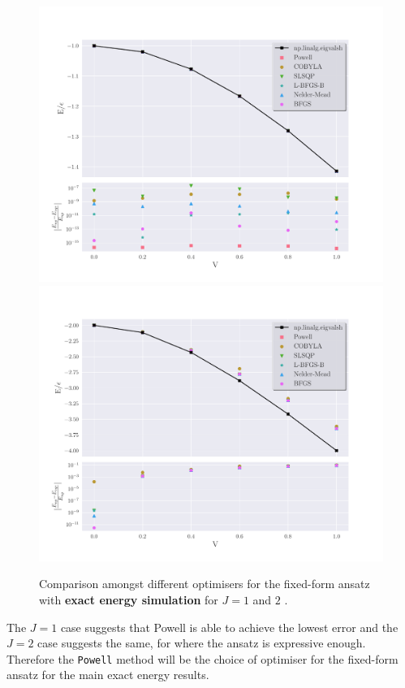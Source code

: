\begin{figure}[ht]
    \centering
    \includegraphics[width=0.45\linewidth]{image/lipkin_result/vqe-opt/cmp_opt_vqe_p_J=1.pdf }
    \includegraphics[width=0.45\linewidth]{image/lipkin_result/vqe-opt/cmp_opt_vqe_p_J=2.pdf }
    \caption{Comparison amongst different optimisers for the fixed-form ansatz with \textbf{ exact energy simulation } for $ J=1 $ and $ 2 $  .}
    \label{fig:opt-fixed-form}
\end{figure}

The $ J=1 $ case suggests that Powell is able to achieve the lowest error and the $ J=2 $ case suggests the same, for where the ansatz is expressive enough. Therefore the \texttt{Powell} method will be the choice of optimiser for the fixed-form ansatz for the main exact energy results.

